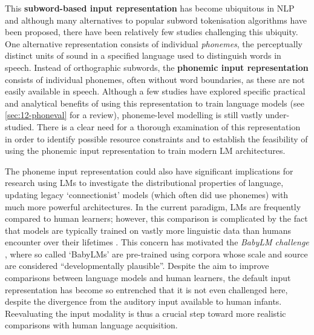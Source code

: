 This \textbf{subword-based input representation} has become ubiquitous in NLP and although many alternatives to popular subword tokenisation algorithms have been proposed, there have been relatively few studies challenging this ubiquity. One alternative representation consists of individual \emph{phonemes}, the perceptually distinct units of sound in a specified language used to distinguish words in speech. Instead of orthographic subwords, the \textbf{phonemic input representation} consists of individual phonemes, often without word boundaries, as these are not easily available in speech. Although a few studies have explored specific practical and analytical benefits of using this representation to train language models (see \cref{sec:12-phoneval} for a review), phoneme-level modelling is still vastly under-studied. There is a clear need for a thorough examination of this representation in order to identify possible resource constraints %
and to establish the feasibility of using the phonemic input representation to train modern LM architectures.%


The phoneme input representation could also have significant implications for research using LMs to investigate the distributional properties of language, updating legacy `connectionist' models (which often did use phonemes) with much more powerful architectures. In the current paradigm, LMs are frequently compared to human learners; however, this comparison is complicated by the fact that models are typically trained on vastly more linguistic data than humans encounter over their lifetimes \citep{huebner-etal-2021-babyberta}. This concern has motivated the \emph{BabyLM challenge} \citep{warstadt-2023-babylm-findings,conll-2024-babylm}, where so called `BabyLMs' are pre-trained using corpora whose scale and source are considered ``developmentally plausible''. Despite the aim to improve comparisons between language models and human learners, the default input representation has become so entrenched that it is not even challenged here, despite the divergence from the auditory input available to human infants. Reevaluating the input modality is thus a crucial step toward more realistic comparisons with human language acquisition.

